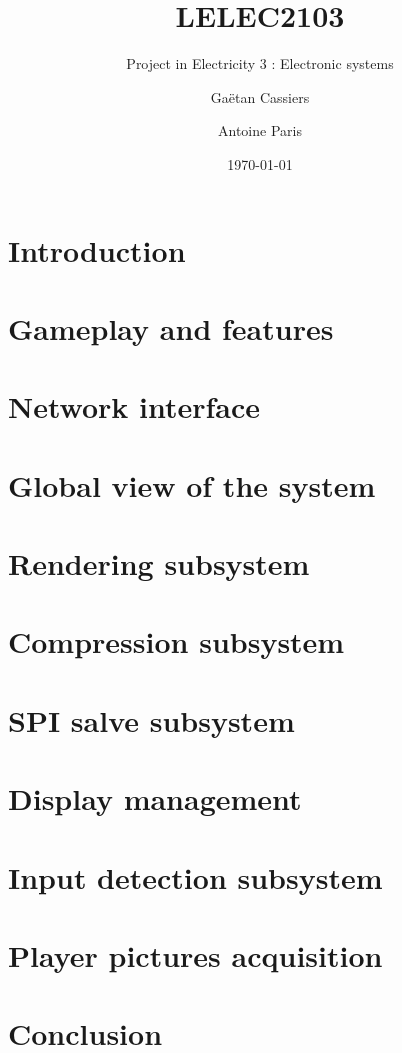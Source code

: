 \documentclass[english, DIV=13]{scrreprt}
\title{LELEC2103}
\subtitle{Project in Electricity 3 : Electronic systems}
\author{Gaëtan Cassiers\and Antoine Paris}
\date{\today}
\begin{document}
\maketitle

\section{Introduction}

\section{Gameplay and features}

\section{Network interface}

\section{Global view of the system}

\section{Rendering subsystem}

\section{Compression subsystem}

\section{SPI salve subsystem}

\section{Display management}

\section{Input detection subsystem}

\section{Player pictures acquisition}

\section{Conclusion}
\end{document}
